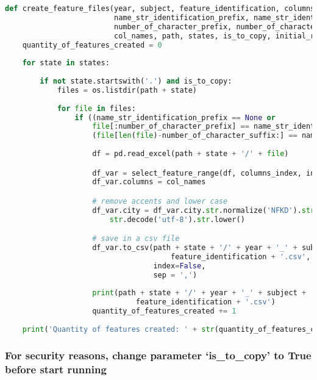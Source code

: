 \begin{lstlisting}[language=Python]
def create_feature_files(year, subject, feature_identification, columns_index, 
                         name_str_identification_prefix, name_str_identification_suffix,
                         number_of_character_prefix, number_of_character_suffix,
                         col_names, path, states, is_to_copy, initial_row):
    quantity_of_features_created = 0
    
    for state in states:
    
        if not state.startswith('.') and is_to_copy:
            files = os.listdir(path + state)
            
            for file in files:
                if ((name_str_identification_prefix == None or 
                    file[:number_of_character_prefix] == name_str_identification_prefix) and 
                    (file[len(file)-number_of_character_suffix:] == name_str_identification_suffix)):
                    
                    df = pd.read_excel(path + state + '/' + file)

                    df_var = select_feature_range(df, columns_index, initial_row)
                    df_var.columns = col_names

                    # remove accents and lower case
                    df_var.city = df_var.city.str.normalize('NFKD').str.encode('ascii', errors='ignore').\
                        str.decode('utf-8').str.lower()

                    # save in a csv file
                    df_var.to_csv(path + state + '/' + year + '_' + subject + '_' + state + '_var_' +
                                      feature_identification + '.csv',
                                  index=False,
                                  sep = ',')
                    
                    print(path + state + '/' + year + '_' + subject + '_' + state + '_var_' + 
                              feature_identification + '.csv')
                    quantity_of_features_created += 1
                    
    print('Quantity of features created: ' + str(quantity_of_features_created))
\end{lstlisting}

\hypertarget{for-security-reasons-change-parameter-is_to_copy-to-true-before-start-running}{%
\subsubsection{For security reasons, change parameter `is\_to\_copy' to
True before start
running}\label{for-security-reasons-change-parameter-is_to_copy-to-true-before-start-running}}

